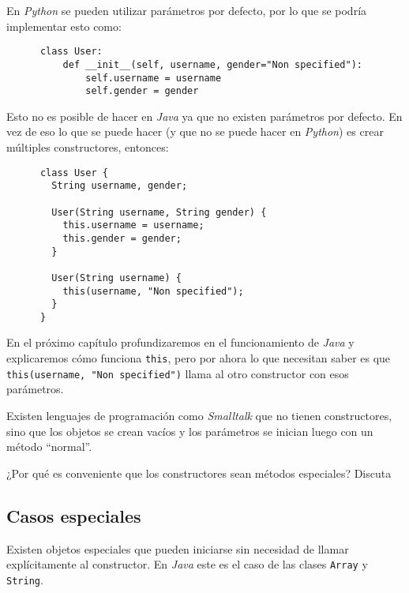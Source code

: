   En \textit{Python} se pueden utilizar parámetros por defecto, por lo que se podría 
  implementar esto como:

  \begin{listing}[ht!]
    \begin{verbatim}
      class User:
          def __init__(self, username, gender="Non specified"):
              self.username = username
              self.gender = gender
    \end{verbatim}
  \end{listing}

  Esto no es posible de hacer en \textit{Java} ya que no existen parámetros por defecto.
  En vez de eso lo que se puede hacer (y que no se puede hacer en \textit{Python}) es 
  crear múltiples constructores, entonces:

  \begin{listing}[ht!]
    \begin{verbatim}
      class User {
        String username, gender;

        User(String username, String gender) {
          this.username = username;
          this.gender = gender;
        }

        User(String username) {
          this(username, "Non specified");
        }
      }
    \end{verbatim}
  \end{listing}

  En el próximo capítulo profundizaremos en el funcionamiento de \textit{Java} y 
  explicaremos cómo funciona \texttt{this}, pero por ahora lo que necesitan 
  saber es que \texttt{this(username, "Non specified")} llama al otro 
  constructor con esos parámetros.

  \begin{exercise}
    Existen lenguajes de programación como \textit{Smalltalk} que no tienen constructores,
    sino que los objetos se crean vacíos y los parámetros se inician luego con un método
    \enquote{normal}.

    ¿Por qué es conveniente que los constructores sean métodos especiales?
    Discuta
  \end{exercise}

  \subsection{Casos especiales}
    Existen objetos especiales que pueden iniciarse sin necesidad de llamar explícitamente
    al constructor.
    En \textit{Java} este es el caso de las clases \texttt{Array} y \texttt{String}.

